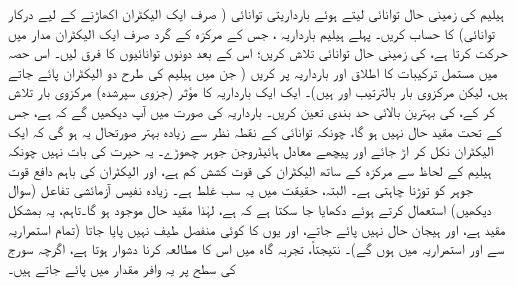  

ہیلیم کی زمینی حال توانائی  لیتے ہوئے بارداریتی توانائی ( صرف ایک الیکٹران اکھاڑنے کے لیے درکار توانائی) کا حساب کریں۔  پہلے ہیلیم بارداریہ ، جس کے مرکزہ کے گرد صرف ایک الیکٹران مدار میں حرکت کرتا ہے، کی زمینی حال توانائی تلاش کریں؛ اس کے بعد دونوں توانائیوں کا فرق لیں۔
اس حصہ میں مستمل ترکیبات کا اطلاق  اور  بارداریہ پر کریں ( جن میں ہیلیم کی طرح دو الیکٹران پائے جاتے ہیں، لیکن مرکزوی بار بالترتیب  اور  ہیں)۔ ایک ایک بارداریہ کا مؤثر (جزوی سپرشدہ) مرکزوی بار تلاش کر کے،  کی بہترین بالائی حد بندی تعین کریں۔  بارداریہ  کی صورت میں آپ دیکھیں گے کہ  ہے، جس کے تحت مقید حال نہیں ہو گا، چونکہ توانائی کے نقطہ نظر سے زیادہ بہتر صورتحال یہ ہو گی کہ ایک الیکٹران نکل کر اڑ جائے اور پیچھے معادل ہائیڈروجن جوہر چھوڑے۔ یہ حیرت کی بات نہیں چونکہ ہیلیم کے لحاظ سے مرکزہ کے ساتھ الیکٹران کی قوت کشش کم ہے، اور الیکٹران کی باہم دافع قوت جوہر کو توڑنا چاہتی ہے۔ البتہ، حقیقت میں یہ سب غلط ہے۔ زیادہ نفیس آزمائشی تفاعل (سوال  دیکھیں) استعمال کرتے ہوئے دکھایا جا سکتا ہے کہ  ہے، لہٰذا مقید حال موجود ہو گا۔تاہم، یہ بمشکل مقید ہے، اور ہیجان حال نہیں پائے جاتے، اور یوں  کا کوئی منفصل طیف نہیں پایا جاتا (تمام استمراریہ سے اور استمراریہ میں ہوں گے)۔ نتیجتاً، تجربہ گاہ میں اس کا مطالعہ کرنا دشوار ہوتا ہے، اگرچہ سورج کی سطح پر یہ وافر مقدار میں پائے جاتے ہیں۔

